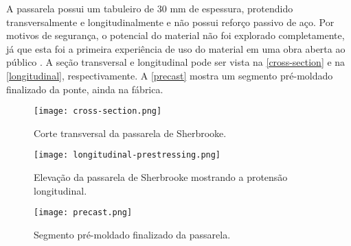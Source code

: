 A passarela possui um tabuleiro de 30 mm de espessura, protendido transversalmente e longitudinalmente e não possui reforço passivo de aço. Por motivos de segurança, o potencial do material não foi explorado completamente, já que esta foi a primeira experiência de uso do material em uma obra aberta ao público \cite[p.~141]{Aitcin_sher}. A seção transversal e longitudinal pode ser vista na \autoref{cross-section} e na \autoref{longitudinal}, respectivamente. A \autoref{precast} mostra um segmento pré-moldado finalizado da ponte, ainda na fábrica.

\begin{figure}[htb]
	\caption{\label{cross-section} Corte transversal da passarela de Sherbrooke.}
	\begin{center}
	    \texttt{[image: cross-section.png]}
	\end{center}
\end{figure}

\begin{figure}[htb]
	\caption{\label{longitudinal}Elevação da passarela de Sherbrooke mostrando a protensão longitudinal.}
	\begin{center}
	    \texttt{[image: longitudinal-prestressing.png]}
	\end{center}
\end{figure}

\begin{figure}[htb]
	\caption{\label{precast}Segmento pré-moldado finalizado da passarela.}
	\begin{center}
	    \texttt{[image: precast.png]}
	\end{center}
\end{figure}